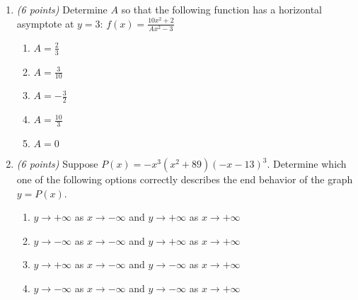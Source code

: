 \documentclass[fleqn]{article}
\begin{document}
\begin{enumerate}
\vspace{0.5in}

\item \textit{(6 points)} Determine $A$ so that the following function has a horizontal asymptote at $y=3$: $f(x) = \frac{10x^2+2}{Ax^2 -3}$
\begin{multicols}{3}
\begin{enumerate}
\item $A = \frac{2}{3}$
\item $A = \frac{3}{10}$
\item $A = -\frac{3}{2}$
\item $A = \frac{10}{3}$
\item $A = 0$
\end{enumerate}
\end{multicols}

\vspace{.5in}

\item \textit{(6 points)} Suppose $P(x) = -x^3(x^2+89)(-x-13)^3$. Determine which one of the following options
correctly describes the end behavior of the graph $y = P(x)$.
\begin{enumerate}
\item $y \rightarrow +\infty$ as $x \rightarrow -\infty$ and $y \rightarrow +\infty$ as $x \rightarrow +\infty$
\item $y \rightarrow -\infty$ as $x \rightarrow -\infty$ and $y \rightarrow +\infty$ as $x \rightarrow +\infty$
\item $y \rightarrow +\infty$ as $x \rightarrow -\infty$ and $y \rightarrow -\infty$ as $x \rightarrow +\infty$
\item $y \rightarrow -\infty$ as $x \rightarrow -\infty$ and $y \rightarrow -\infty$ as $x \rightarrow +\infty$
\end{enumerate}


\end{enumerate}
\end{document}
